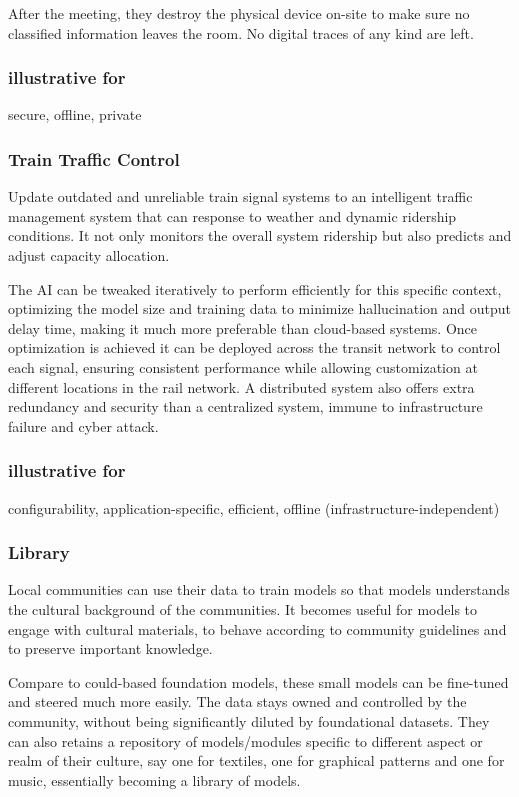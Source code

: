 \documentclass[12pt]{article}
\begin{document}
After the meeting, they destroy the physical device on-site to make sure no classified information leaves the room. No digital traces of any kind are left.

\subsubsection*{illustrative for}
secure, offline, private

\subsubsection*{Train Traffic Control}
Update outdated and unreliable train signal systems to an intelligent traffic management system that can response to weather and dynamic ridership conditions. It not only monitors the overall system ridership but also predicts and adjust capacity allocation.

The AI can be tweaked iteratively to perform efficiently for this specific context, optimizing the model size and training data to minimize hallucination and output delay time, making it much more preferable than cloud-based systems. Once optimization is achieved it can be deployed across the transit network to control each signal, ensuring consistent performance while allowing customization at different locations in the rail network. A distributed system also offers extra redundancy and security than a centralized system, immune to infrastructure failure and cyber attack.

\subsubsection*{illustrative for}
configurability, application-specific, efficient, offline (infrastructure-independent)

\subsubsection*{Library}
Local communities can use their data to train models so that models understands the cultural background of the communities. It becomes useful for models to engage with cultural materials, to behave according to community guidelines and to preserve important knowledge.

Compare to could-based foundation models, these small models can be fine-tuned and steered much more easily. The data stays owned and controlled by the community, without being significantly diluted by foundational datasets. They can also retains a repository of models/modules specific to different aspect or realm of their culture, say one for textiles, one for graphical patterns and one for music, essentially becoming a library of models.
\end{document}
